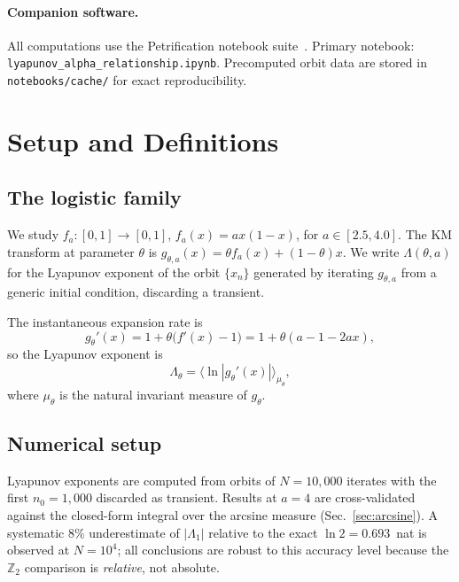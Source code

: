 \documentclass[aps,pre,twocolumn,superscriptaddress,nofootinbib,
               longbibliography,floatfix]{revtex4-2}
\newcommand{\Lam}{\Lambda}
\theoremstyle{plain}
\theoremstyle{remark}
\begin{document}
\paragraph{Companion software.}
All computations use the Petrification notebook
suite~\cite{PetrificationRepo}.
Primary notebook: \texttt{lyapunov\_alpha\_relationship.ipynb}.
Precomputed orbit data are stored in \texttt{notebooks/cache/}
for exact reproducibility.

\section{Setup and Definitions}
\label{sec:setup}

\subsection{The logistic family}

We study $f_a : [0,1]\to[0,1]$, $f_a(x) = ax(1-x)$, for
$a \in [2.5, 4.0]$.
The KM transform at parameter $\theta$ is
$g_{\theta,a}(x) = \theta f_a(x) + (1-\theta)x$.
We write $\Lam(\theta, a)$ for the Lyapunov exponent of the
orbit $\{x_n\}$ generated by iterating $g_{\theta,a}$ from
a generic initial condition, discarding a transient.

The instantaneous expansion rate is
%
\begin{equation}
  g_\theta'(x) = 1 + \theta\bigl(f'(x) - 1\bigr)
               = 1 + \theta(a - 1 - 2ax),
  \label{eq:gp}
\end{equation}
%
so the Lyapunov exponent is
%
\begin{equation}
  \Lam_\theta = \bigl\langle \ln|g_\theta'(x)| \bigr\rangle_{\mu_\theta},
  \label{eq:lyap}
\end{equation}
%
where $\mu_\theta$ is the natural invariant measure of $g_\theta$.

\subsection{Numerical setup}

Lyapunov exponents are computed from orbits of
$N = 10{,}000$ iterates with the first $n_0 = 1{,}000$
discarded as transient.  Results at $a = 4$ are cross-validated
against the closed-form integral over the arcsine measure
(Sec.~\ref{sec:arcsine}).  A systematic 8\% underestimate
of $|\Lam_1|$ relative to the exact $\ln 2 = 0.693$~nat
is observed at $N = 10^4$; all conclusions are robust to
this accuracy level because the $\mathbb{Z}_2$ comparison
is \emph{relative}, not absolute.
\end{document}
